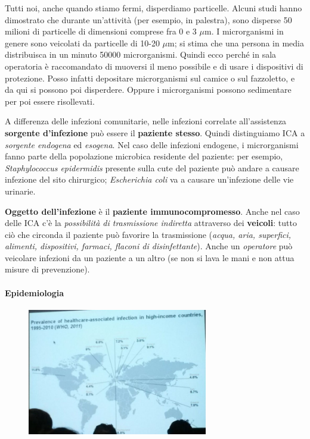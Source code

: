 Tutti noi, anche quando stiamo fermi, disperdiamo particelle. Alcuni
studi hanno dimostrato che durante un'attività (per esempio, in
palestra), sono disperse 50 milioni di particelle di dimensioni comprese
fra 0 e 3 $\mu$m. I microrganismi in genere sono veicolati da particelle di
10-20 $\mu$m; si stima che una persona in media distribuisca in un minuto
50000 microrganismi. Quindi ecco perché in sala operatoria è
raccomandato di muoversi il meno possibile e di usare i dispositivi di
protezione. Posso infatti depositare microrganismi sul camice o sul
fazzoletto, e da qui si possono poi disperdere. Oppure i microrganismi
possono sedimentare per poi essere risollevati.

A differenza delle infezioni comunitarie, nelle infezioni correlate
all'assistenza \textbf{sorgente d'infezione} può essere il
\textbf{paziente stesso}. Quindi distinguiamo ICA a \emph{sorgente
endogena} ed \emph{esogena}. Nel caso delle infezioni endogene, i
microrganismi fanno parte della popolazione microbica residente del
paziente: per esempio, \emph{Staphylococcus epidermidis} presente sulla
cute del paziente può andare a causare infezione del sito chirurgico;
\emph{Escherichia coli} va a causare un'infezione delle vie urinarie.

\textbf{Oggetto dell'infezione} è il \textbf{paziente
immunocompromesso}. Anche nel caso delle ICA c'è la \emph{possibilità di
trasmissione indiretta} attraverso dei \textbf{veicoli}: tutto ciò che
circonda il paziente può favorire la trasmissione (\emph{acqua, aria,
superfici, alimenti, dispositivi, farmaci, flaconi di disinfettante}).
Anche un \emph{operatore} può veicolare infezioni da un paziente a un
altro (se non si lava le mani e non attua misure di prevenzione).

\paragraph{Epidemiologia}

\begin{figure}[!ht]
\centering
	\includegraphics[width=0.7\textwidth]{19/image3.jpeg}
	\end{figure}
	
